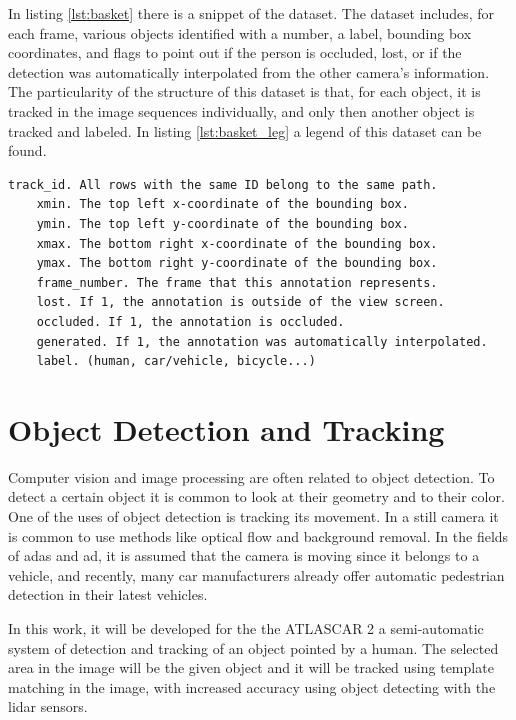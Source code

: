 In listing \ref{lst:basket} there is a snippet of the dataset. The dataset includes, for each frame, various objects identified with a number, a label, bounding box coordinates, and flags to point out if the person is occluded, lost, or if the detection was automatically interpolated from the other camera's information. \cite{EPFLEcolepolytechniquefederaledeLausanne} The particularity of the structure of this dataset is that, for each object, it is tracked in the image sequences individually, and only then another object is tracked and labeled. In listing \ref{lst:basket_leg} a legend of this dataset can be found.

\begin{center}
	\begin{lstlisting}[label={lst:basket_leg}, caption={EPFL dataset legend.}]
	track_id. All rows with the same ID belong to the same path.
	xmin. The top left x-coordinate of the bounding box.
	ymin. The top left y-coordinate of the bounding box.
	xmax. The bottom right x-coordinate of the bounding box.
	ymax. The bottom right y-coordinate of the bounding box.
	frame_number. The frame that this annotation represents.
	lost. If 1, the annotation is outside of the view screen.
	occluded. If 1, the annotation is occluded.
	generated. If 1, the annotation was automatically interpolated.
	label. (human, car/vehicle, bicycle...)	\end{lstlisting}
\end{center}



\section{Object Detection and Tracking}
Computer vision and image processing are often related to object detection. To detect a certain object it is common to look at their geometry and to their color. One of the uses of object detection is tracking its movement. In a still camera it is common to use methods like optical flow and background removal. In the fields of \gls{adas} and \gls{ad}, it is assumed that the camera is moving since it belongs to a vehicle, and recently, many car manufacturers already offer automatic pedestrian detection in their latest vehicles. 

In this work, it will be developed for the the ATLASCAR 2 a semi-automatic system of detection and tracking of an object pointed by a human. The selected area in the image  will be the given object and it will be tracked using template matching in the image, with increased accuracy using object detecting with the \gls{lidar} sensors.

